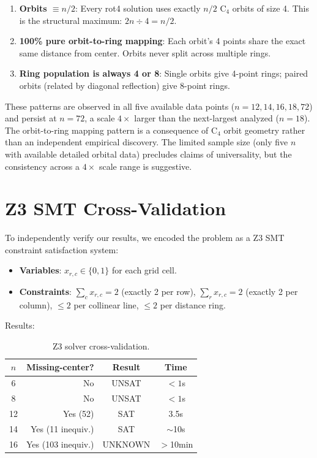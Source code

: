 \documentclass[11pt,a4paper]{article}
\theoremstyle{plain}
\theoremstyle{definition}
\begin{document}
\begin{enumerate}[nosep]
\item \textbf{Orbits $\equiv n/2$}: Every rot4 solution uses exactly $n/2$ C$_4$ orbits of size 4. This is the structural maximum: $2n\div4=n/2$.
\item \textbf{100\% pure orbit-to-ring mapping}: Each orbit's 4 points share the exact same distance from center. Orbits never split across multiple rings.
\item \textbf{Ring population is always 4 or 8}: Single orbits give 4-point rings; paired orbits (related by diagonal reflection) give 8-point rings.
\end{enumerate}

These patterns are observed in all five available data points ($n=12,14,16,18,72$) and persist at $n=72$, a scale $4\times$ larger than the next-largest analyzed ($n=18$). The orbit-to-ring mapping pattern is a consequence of C$_4$ orbit geometry rather than an independent empirical discovery. The limited sample size (only five $n$ with available detailed orbital data) precludes claims of universality, but the consistency across a $4\times$ scale range is suggestive.

\section{Z3 SMT Cross-Validation}
\label{sec:z3}

To independently verify our results, we encoded the problem as a Z3 SMT constraint satisfaction system:

\begin{itemize}[nosep]
\item \textbf{Variables}: $x_{r,c}\in\{0,1\}$ for each grid cell.
\item \textbf{Constraints}: $\sum_c x_{r,c}=2$ (exactly 2 per row), $\sum_r x_{r,c}=2$ (exactly 2 per column), $\le2$ per collinear line, $\le2$ per distance ring.
\end{itemize}

Results:
\begin{table}[H]
\centering
\caption{Z3 solver cross-validation.}
\label{tab:z3}
\begin{tabular}{crcc}
\toprule
$n$ & Missing-center? & Result & Time \\
\midrule
6 & No & UNSAT & $<1$s \\
8 & No & UNSAT & $<1$s \\
12 & Yes (52) & SAT & 3.5s \\
14 & Yes (11 inequiv.) & SAT & $\sim$10s \\
16 & Yes (103 inequiv.) & UNKNOWN & $>$10min \\
\bottomrule
\end{tabular}
\end{table}
\end{document}

